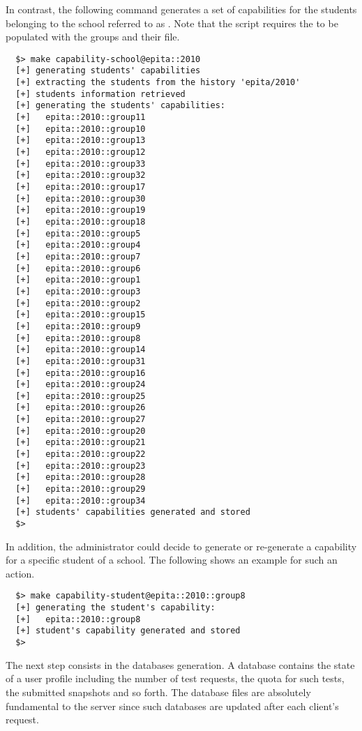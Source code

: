 In contrast, the following command generates a set of capabilities for the
students belonging to the school referred to as . Note
that the script requires the  to be populated
with the groups and their  file.

\begin{verbatim}
  $> make capability-school@epita::2010
  [+] generating students' capabilities
  [+] extracting the students from the history 'epita/2010'
  [+] students information retrieved
  [+] generating the students' capabilities:
  [+]   epita::2010::group11
  [+]   epita::2010::group10
  [+]   epita::2010::group13
  [+]   epita::2010::group12
  [+]   epita::2010::group33
  [+]   epita::2010::group32
  [+]   epita::2010::group17
  [+]   epita::2010::group30
  [+]   epita::2010::group19
  [+]   epita::2010::group18
  [+]   epita::2010::group5
  [+]   epita::2010::group4
  [+]   epita::2010::group7
  [+]   epita::2010::group6
  [+]   epita::2010::group1
  [+]   epita::2010::group3
  [+]   epita::2010::group2
  [+]   epita::2010::group15
  [+]   epita::2010::group9
  [+]   epita::2010::group8
  [+]   epita::2010::group14
  [+]   epita::2010::group31
  [+]   epita::2010::group16
  [+]   epita::2010::group24
  [+]   epita::2010::group25
  [+]   epita::2010::group26
  [+]   epita::2010::group27
  [+]   epita::2010::group20
  [+]   epita::2010::group21
  [+]   epita::2010::group22
  [+]   epita::2010::group23
  [+]   epita::2010::group28
  [+]   epita::2010::group29
  [+]   epita::2010::group34
  [+] students' capabilities generated and stored
  $> 
\end{verbatim}

In addition, the administrator could decide to generate or re-generate
a capability for a specific student of a school. The following shows an
example for such an action.

\begin{verbatim}
  $> make capability-student@epita::2010::group8
  [+] generating the student's capability:
  [+]   epita::2010::group8
  [+] student's capability generated and stored
  $> 
\end{verbatim}

The next step consists in the databases generation. A database contains the
state of a user profile including the number of test requests, the quota for
such tests, the submitted snapshots and so forth. The database files are
absolutely fundamental to the server since such databases are updated after
each client's request.

